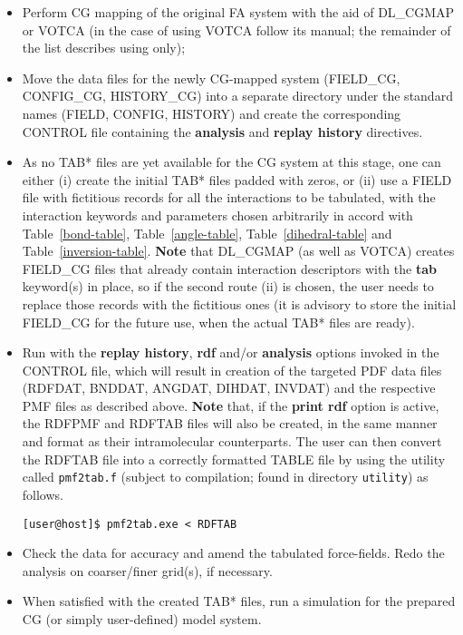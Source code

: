 \begin{itemize}
\item Perform CG mapping of the original FA system with the aid 
of DL\_CGMAP or VOTCA (in the case of using VOTCA follow its manual; 
the remainder of the list describes using \D only); 
\item Move the data files for the newly CG-mapped system 
(FIELD\_CG, CONFIG\_CG, HISTORY\_CG) into a separate directory 
under the standard names (FIELD, CONFIG, HISTORY) and create 
the corresponding CONTROL file containing the {\bf analysis} 
and {\bf replay history} directives.
\item As no TAB* files are yet available for the CG system 
at this stage, one can either (i) create the initial TAB* files 
padded with zeros, or (ii) use a FIELD file with fictitious records 
for all the interactions to be tabulated, with the interaction 
keywords and parameters chosen arbitrarily in accord with 
Table~\ref{bond-table}, Table~\ref{angle-table}, 
Table~\ref{dihedral-table} and Table~\ref{inversion-table}. 
{\bf Note} that DL\_CGMAP (as well as VOTCA) creates FIELD\_CG files 
that already contain interaction descriptors with the {\bf tab} 
keyword(s) in place, so if the second route (ii) is chosen, 
the user needs to replace those records with the fictitious ones
(it is advisory to store the initial FIELD\_CG for the future 
use, when the actual TAB* files are ready).
\item Run \D with the {\bf replay history}, {\bf rdf} and/or 
{\bf analysis} options invoked in the CONTROL file, which 
will result in creation of the targeted PDF data files (RDFDAT, 
BNDDAT, ANGDAT, DIHDAT, INVDAT) and the respective PMF files 
as described above. {\bf Note} that, if the {\bf print rdf} 
option is active, the RDFPMF and RDFTAB files will also be 
created, in the same manner and format as their intramolecular 
counterparts. The user can then convert the RDFTAB file into 
a correctly formatted TABLE file by using the utility called 
{\tt pmf2tab.f} (subject to compilation; found in \D directory 
{\tt utility}) as follows.


\begin{verbatim}
[user@host]$ pmf2tab.exe < RDFTAB
\end{verbatim}

\item Check the data for accuracy and amend the tabulated 
force-fields. Redo the analysis on coarser/finer grid(s), 
if necessary.

\item When satisfied with the created TAB* files, run 
a \D simulation for the prepared CG (or simply user-defined) 
model system.
\end{itemize}

